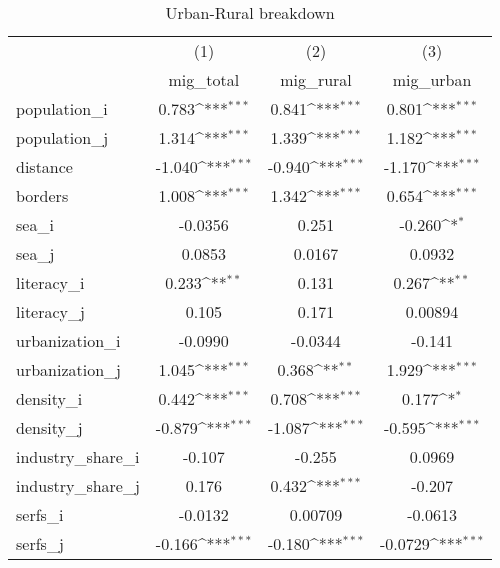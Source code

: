 {
\def\sym#1{\ifmmode^{#1}\else\(^{#1}\)\fi}
\begin{longtable}{l*{3}{c}}
\caption{Urban-Rural breakdown\label{table:ruralurban}}\\
\hline\hline\endfirsthead\hline\endhead\hline\endfoot\endlastfoot
                    &\multicolumn{1}{c}{(1)}&\multicolumn{1}{c}{(2)}&\multicolumn{1}{c}{(3)}\\
                    &\multicolumn{1}{c}{mig\_total}&\multicolumn{1}{c}{mig\_rural}&\multicolumn{1}{c}{mig\_urban}\\
\hline
population\_i        &       0.783\sym{***}&       0.841\sym{***}&       0.801\sym{***}\\
population\_j        &       1.314\sym{***}&       1.339\sym{***}&       1.182\sym{***}\\
distance            &      -1.040\sym{***}&      -0.940\sym{***}&      -1.170\sym{***}\\
borders             &       1.008\sym{***}&       1.342\sym{***}&       0.654\sym{***}\\
sea\_i               &     -0.0356         &       0.251         &      -0.260\sym{*}  \\
sea\_j               &      0.0853         &      0.0167         &      0.0932         \\
literacy\_i          &       0.233\sym{**} &       0.131         &       0.267\sym{**} \\
literacy\_j          &       0.105         &       0.171         &     0.00894         \\
urbanization\_i      &     -0.0990         &     -0.0344         &      -0.141         \\
urbanization\_j      &       1.045\sym{***}&       0.368\sym{**} &       1.929\sym{***}\\
density\_i           &       0.442\sym{***}&       0.708\sym{***}&       0.177\sym{*}  \\
density\_j           &      -0.879\sym{***}&      -1.087\sym{***}&      -0.595\sym{***}\\
industry\_share\_i    &      -0.107         &      -0.255         &      0.0969         \\
industry\_share\_j    &       0.176         &       0.432\sym{***}&      -0.207         \\
serfs\_i             &     -0.0132         &     0.00709         &     -0.0613         \\
serfs\_j             &      -0.166\sym{***}&      -0.180\sym{***}&     -0.0729\sym{***}\\

\end{longtable}}
